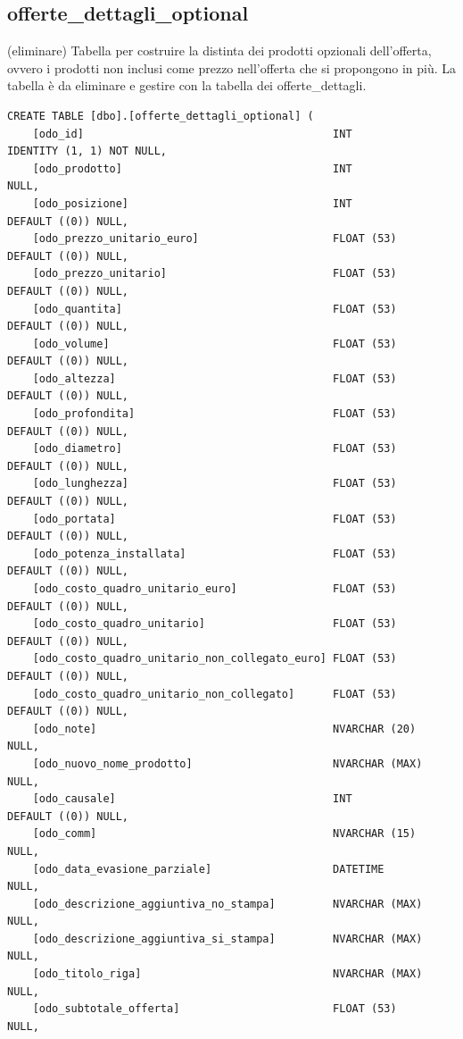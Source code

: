 \documentclass[12pt]{article}
\begin{document}
\subsection{offerte\_dettagli\_optional}(eliminare)
Tabella per costruire la distinta dei prodotti opzionali dell'offerta,
ovvero i prodotti non inclusi come prezzo nell'offerta che si propongono in più.
La tabella è da eliminare e gestire con la tabella dei offerte\_dettagli.
\begin{lstlisting}
CREATE TABLE [dbo].[offerte_dettagli_optional] (
    [odo_id]                                       INT            IDENTITY (1, 1) NOT NULL,
    [odo_prodotto]                                 INT            NULL,
    [odo_posizione]                                INT            DEFAULT ((0)) NULL,
    [odo_prezzo_unitario_euro]                     FLOAT (53)     DEFAULT ((0)) NULL,
    [odo_prezzo_unitario]                          FLOAT (53)     DEFAULT ((0)) NULL,
    [odo_quantita]                                 FLOAT (53)     DEFAULT ((0)) NULL,
    [odo_volume]                                   FLOAT (53)     DEFAULT ((0)) NULL,
    [odo_altezza]                                  FLOAT (53)     DEFAULT ((0)) NULL,
    [odo_profondita]                               FLOAT (53)     DEFAULT ((0)) NULL,
    [odo_diametro]                                 FLOAT (53)     DEFAULT ((0)) NULL,
    [odo_lunghezza]                                FLOAT (53)     DEFAULT ((0)) NULL,
    [odo_portata]                                  FLOAT (53)     DEFAULT ((0)) NULL,
    [odo_potenza_installata]                       FLOAT (53)     DEFAULT ((0)) NULL,
    [odo_costo_quadro_unitario_euro]               FLOAT (53)     DEFAULT ((0)) NULL,
    [odo_costo_quadro_unitario]                    FLOAT (53)     DEFAULT ((0)) NULL,
    [odo_costo_quadro_unitario_non_collegato_euro] FLOAT (53)     DEFAULT ((0)) NULL,
    [odo_costo_quadro_unitario_non_collegato]      FLOAT (53)     DEFAULT ((0)) NULL,
    [odo_note]                                     NVARCHAR (20)  NULL,
    [odo_nuovo_nome_prodotto]                      NVARCHAR (MAX) NULL,
    [odo_causale]                                  INT            DEFAULT ((0)) NULL,
    [odo_comm]                                     NVARCHAR (15)  NULL,
    [odo_data_evasione_parziale]                   DATETIME       NULL,
    [odo_descrizione_aggiuntiva_no_stampa]         NVARCHAR (MAX) NULL,
    [odo_descrizione_aggiuntiva_si_stampa]         NVARCHAR (MAX) NULL,
    [odo_titolo_riga]                              NVARCHAR (MAX) NULL,
    [odo_subtotale_offerta]                        FLOAT (53)     NULL,

\end{lstlisting}
\end{document}
